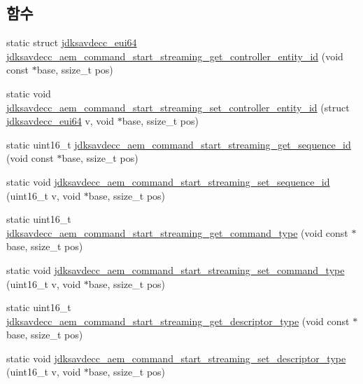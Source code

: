 \subsection*{함수}
\begin{DoxyCompactItemize}
\item 
static struct \hyperlink{structjdksavdecc__eui64}{jdksavdecc\+\_\+eui64} \hyperlink{group__command__start__streaming_ga61671a36c1527d1e4a6ef849d1b894c7}{jdksavdecc\+\_\+aem\+\_\+command\+\_\+start\+\_\+streaming\+\_\+get\+\_\+controller\+\_\+entity\+\_\+id} (void const $\ast$base, ssize\+\_\+t pos)
\item 
static void \hyperlink{group__command__start__streaming_ga0d9e71f5dc430f3f5bb7ee6293568ec3}{jdksavdecc\+\_\+aem\+\_\+command\+\_\+start\+\_\+streaming\+\_\+set\+\_\+controller\+\_\+entity\+\_\+id} (struct \hyperlink{structjdksavdecc__eui64}{jdksavdecc\+\_\+eui64} v, void $\ast$base, ssize\+\_\+t pos)
\item 
static uint16\+\_\+t \hyperlink{group__command__start__streaming_ga409b658e63b7e35ba2e6408c5c7c37b3}{jdksavdecc\+\_\+aem\+\_\+command\+\_\+start\+\_\+streaming\+\_\+get\+\_\+sequence\+\_\+id} (void const $\ast$base, ssize\+\_\+t pos)
\item 
static void \hyperlink{group__command__start__streaming_ga8094451ae3689ca048a1c54b40c81a32}{jdksavdecc\+\_\+aem\+\_\+command\+\_\+start\+\_\+streaming\+\_\+set\+\_\+sequence\+\_\+id} (uint16\+\_\+t v, void $\ast$base, ssize\+\_\+t pos)
\item 
static uint16\+\_\+t \hyperlink{group__command__start__streaming_ga1160858decf8209ea11dbcac358b7985}{jdksavdecc\+\_\+aem\+\_\+command\+\_\+start\+\_\+streaming\+\_\+get\+\_\+command\+\_\+type} (void const $\ast$base, ssize\+\_\+t pos)
\item 
static void \hyperlink{group__command__start__streaming_ga51d32af46b4746cc2ae881444a27a78a}{jdksavdecc\+\_\+aem\+\_\+command\+\_\+start\+\_\+streaming\+\_\+set\+\_\+command\+\_\+type} (uint16\+\_\+t v, void $\ast$base, ssize\+\_\+t pos)
\item 
static uint16\+\_\+t \hyperlink{group__command__start__streaming_ga22bccde2a4f1b3c988d6bbbde1700efb}{jdksavdecc\+\_\+aem\+\_\+command\+\_\+start\+\_\+streaming\+\_\+get\+\_\+descriptor\+\_\+type} (void const $\ast$base, ssize\+\_\+t pos)
\item 
static void \hyperlink{group__command__start__streaming_ga32fc98197f06e9d4d4ca7646afcbfc05}{jdksavdecc\+\_\+aem\+\_\+command\+\_\+start\+\_\+streaming\+\_\+set\+\_\+descriptor\+\_\+type} (uint16\+\_\+t v, void $\ast$base, ssize\+\_\+t pos)

\end{DoxyCompactItemize}
